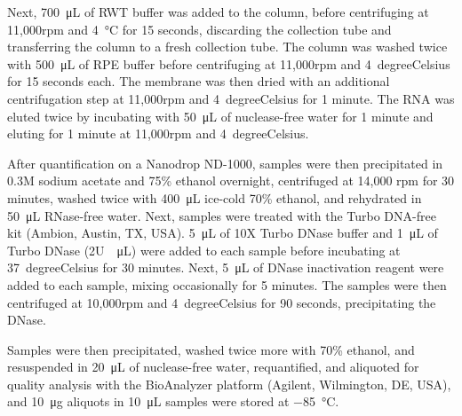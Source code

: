 Next, \SI{700}{\micro\liter} of RWT buffer was added to the column, before centrifuging at 11,000rpm and \SI{4}{\degreeCelsius} for 15 seconds, discarding the collection tube and transferring the column to a fresh collection tube. The column was washed twice with \SI{500}{\micro\liter} of RPE buffer before centrifuging at 11,000rpm and \SI{4}{degreeCelsius} for 15 seconds each. The membrane was then dried with an additional centrifugation step at 11,000rpm and \SI{4}{degreeCelsius} for 1 minute. The RNA was eluted twice by incubating with \SI{50}{\micro\liter} of nuclease-free water for 1 minute and eluting for 1 minute at 11,000rpm and \SI{4}{degreeCelsius}.

After quantification on a Nanodrop ND-1000, samples were then precipitated in 0.3M sodium acetate and 75\% ethanol overnight, centrifuged at 14,000 rpm for 30 minutes, washed twice with \SI{400}{\micro\liter} ice-cold 70\% ethanol, and rehydrated in \SI{50}{\micro\liter} RNase-free water. Next, samples were treated with the Turbo DNA-free kit (Ambion, Austin, TX, USA). \SI{5}{\micro\liter} of 10X Turbo DNase buffer and \SI{1}{\micro\liter} of Turbo DNase (2U\SI{}{\per\micro\liter}) were added to each sample before incubating at \SI{37}{degreeCelsius} for 30 minutes. Next, \SI{5}{\micro\liter} of DNase inactivation reagent were added to each sample, mixing occasionally for 5 minutes. The samples were then centrifuged at 10,000rpm and \SI{4}{degreeCelsius} for 90 seconds, precipitating the DNase. 

Samples were then precipitated, washed twice more with 70\% ethanol, and resuspended in \SI{20}{\micro\liter} of nuclease-free water, requantified, and aliquoted for quality analysis with the BioAnalyzer platform (Agilent, Wilmington, DE, USA), and \SI{10}{\micro\gram} aliquots in \SI{10}{\micro\liter} samples were stored at \SI{-85}{\degreeCelsius}.

